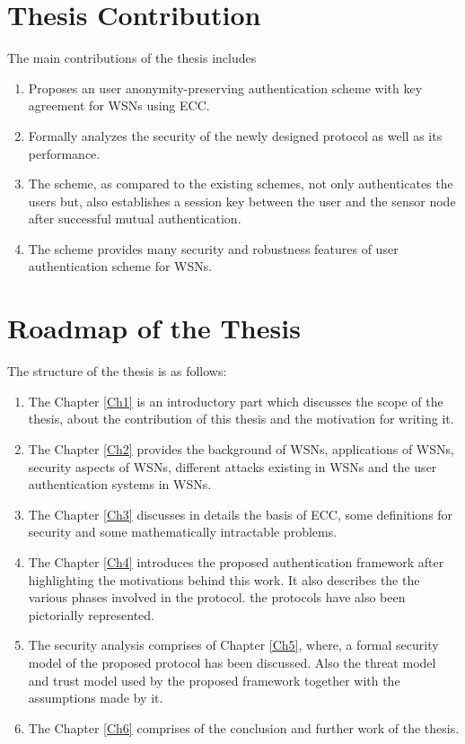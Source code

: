 \documentclass[a4paper,12pt]{report}
\begin{document}
\section{Thesis Contribution}
The main contributions of the thesis includes
\begin{enumerate}
\item Proposes an user anonymity-preserving authentication scheme with key agreement for WSNs using ECC.
\item Formally analyzes the security of the newly designed protocol as well as its performance.
\item The scheme, as compared to the existing schemes, not only authenticates the users but,
also establishes a session key between the user and the sensor node
after successful mutual authentication.
\item The scheme provides many security and robustness features of user authentication scheme for WSNs.
\end{enumerate}

\section{Roadmap of the Thesis}
The structure of the thesis is as follows:
\begin{enumerate}
\item The Chapter \ref{Ch1} is an introductory part which
discusses the scope of the thesis, about the contribution of this
thesis and the motivation for writing it.

\item The Chapter \ref{Ch2} provides the background of WSNs,
applications of WSNs, security aspects of WSNs, different attacks
existing in WSNs and the user authentication systems in WSNs.

\item The Chapter \ref{Ch3} discusses in details
the basis of ECC, some definitions for security and some
mathematically intractable problems.

\item The Chapter \ref{Ch4} introduces the proposed
authentication framework after highlighting the motivations behind
this work. It also describes the the various phases involved in the
protocol. the protocols have also been pictorially represented.

\item The security analysis comprises of Chapter \ref{Ch5}, where, a formal
security model of the proposed protocol has been discussed. Also the
threat model and trust model used by the proposed framework together
with the assumptions made by it.

\item  The Chapter \ref{Ch6} comprises of the conclusion and further work of the thesis.
\end{enumerate}
\end{document}
